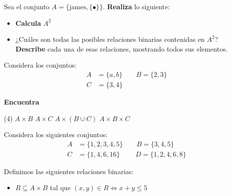 \documentclass[oneside]{style}
\begin{document}
\begin{questions}[label=\protect\circled{\bfseries\arabic*}]

    \question
    {
        Sea el conjunto $A = \{\text{james}, \{\bullet\}\}$. \textbf{Realiza} 
        lo siguiente:
        \begin{itemize}
            \item \textbf{Calcula} $A^2$
            \item ¿Cuáles son todas las posibles relaciones binarias contenidas 
            en $A^2$? \textbf{Describe} cada una de esas relaciones, mostrando 
            todos sus elementos. 
        \end{itemize}
    }


    \question
    {
        Considera los conjuntos:
        \begin{align*}
            A &= \{a,b\} \quad \quad B = \{2,3\} \\ 
            C &= \{3,4\}
        \end{align*}

        \textbf{Encuentra} 
        \begin{tasks}(4)
            \task $A \times B$
            \task $A \times C$
            \task $A \times (B \cup C)$ 
            \task $A \times B \times C$
        \end{tasks}
    }


    \question
    {
        Considera los siguientes conjuntos:
        \begin{align*}
            A &= \{1,2,3,4,5\} \quad \quad B = \{3,4,5\} \\ 
            C &= \{1,4,6,16\} \quad \quad \; D = \{1,2,4,6,8\}
        \end{align*}

        Definimos las siguientes relaciones binarias:
        \begin{itemize}
            \item $R \subseteq A \times B$ tal que $(x,y) \in R 
            \Leftrightarrow x+y \leq 5$


\end{itemize}}
\end{questions}
\end{document}
